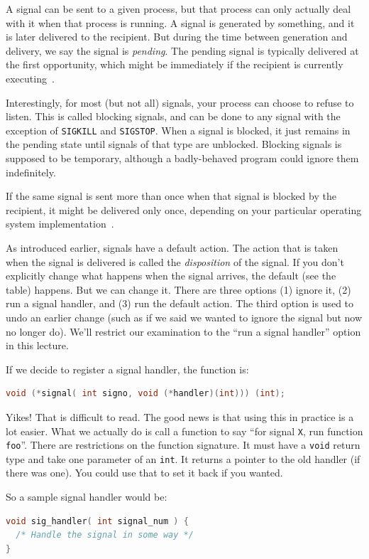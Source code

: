 A signal can be sent to a given process, but that process can only actually deal with it when that process is running. A signal is generated by something, and it is later delivered to the recipient. But during the time between generation and delivery, we say the signal is \textit{pending}. The pending signal is typically delivered at the first opportunity, which might be immediately if the recipient is currently executing~\cite{lpi}.

Interestingly, for most (but not all) signals, your process can choose to refuse to listen.  This is called blocking signals, and can be done to any signal with the exception of \texttt{SIGKILL} and \texttt{SIGSTOP}. When a signal is blocked, it just remains in the pending state until signals of that type are unblocked. Blocking signals is supposed to be temporary, although a badly-behaved program could ignore them indefinitely.

If the same signal is sent more than once when that signal is blocked by the recipient, it might be delivered only once, depending on your particular operating system implementation~\cite{apunix}.

As introduced earlier, signals have a default action. The action that is taken when the signal is delivered is called the \textit{disposition} of the signal. If you don't explicitly change what happens when the signal arrives, the default (see the table) happens. But we can change it. There are three options (1) ignore it, (2) run a signal handler, and (3) run the default action. The third option is used to undo an earlier change (such as if we said we wanted to ignore the signal but now no longer do). We'll restrict our examination to the ``run a signal handler'' option in this lecture.

If we decide to register a signal handler, the function is:
\begin{lstlisting}[language=C]
void (*signal( int signo, void (*handler)(int))) (int);
\end{lstlisting}

Yikes! That is difficult to read. The good news is that using this in practice is a lot easier. What we actually do is call a function to say ``for signal \texttt{X}, run function \texttt{foo}''. There are restrictions on the function signature. It must have a \texttt{void} return type and take one parameter of an \texttt{int}. It returns a pointer to the old handler (if there was one). You could use that to set it back if you wanted.

So a sample signal handler would be:
\begin{lstlisting}[language=C]
void sig_handler( int signal_num ) {
  /* Handle the signal in some way */
}
\end{lstlisting}

